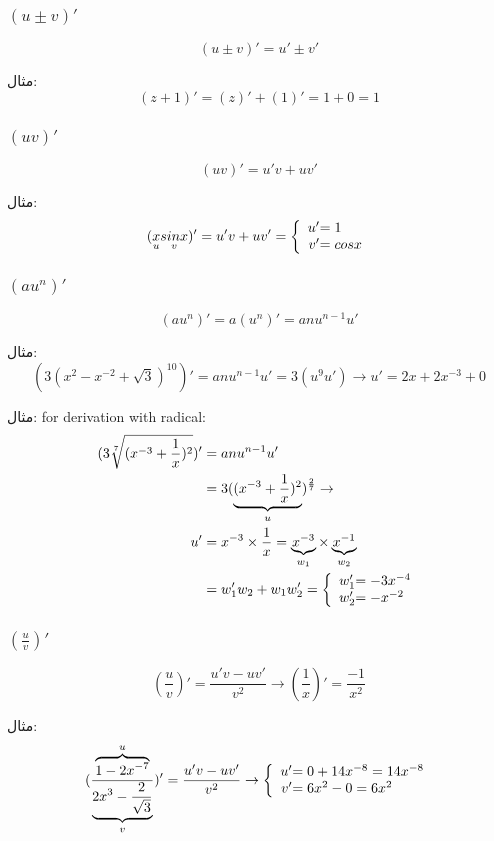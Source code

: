 \subsubsection{$(u \pm v)'$}
\[ (u \pm v)' = u' \pm v' \]

مثال:
\[ (z + 1)' = (z)' + (1)' = 1 + 0 = 1 \]

\subsubsection{$(uv)'$}
\[ (uv)' = u'v + uv' \]

مثال:
\begin{align*}
(\underset{u}{x}\underset{v}{sin x})' = u'v + uv' = 
\left\lbrace
\begin{array}{r@{}l}
	u' &= 1 \\
	v' &= cos x
\end{array}
\right.
\end{align*}

\subsubsection{$(au^n)'$}
\[ (au^n)' = a(u^n)' = anu^{n-1}u' \]

مثال:
\[ (3(x^2-x^{-2}+\sqrt{3})^{10})' = anu^{n-1}u' = 3(u^9u') \to u' = 2x +2x^{-3} + 0 \]

مثال: for derivation with radical:
\begin{align*}
(3\sqrt[7]{(x^{-3}+\frac{1}{x})^2})' &= anu^{n-1}u' \\
&= 3(\underbrace{(x^{-3}+\frac{1}{x})^2}_u)^{\frac{2}{7}} \to \\
u' &= x^{-3}\times\frac{1}{x} =
\underbrace{x^{-3}}_{w_1} \times \underbrace{x^{-1}}_{w_2} \\
&= w_1'w_2+w_1w_2' = 
\left\lbrace
\begin{array}{r@{}l}
	w_1' &= -3x^{-4} \\
	w_2' &= -x^{-2}
\end{array}
\right.
\end{align*}

\subsubsection{$(\frac{u}{v})'$}
\[ (\frac{u}{v})' = \frac{u'v - uv'}{v^2} \to (\frac{1}{x})' = \frac{-1}{x^2} \]

مثال:
\begin{align*}
(\frac{\overbrace{1-2x^{-7}}^u}{\underbrace{2x^3-\frac{2}{\sqrt{3}}}_v})' = \frac{u'v - uv'}{v^2} \to
\left\lbrace
\begin{array}{r@{}l}
	u' &= 0 + 14x^{-8} = 14x^{-8} \\
	v' &= 6x^2-0 = 6x^2
\end{array}
\right.
\end{align*}

